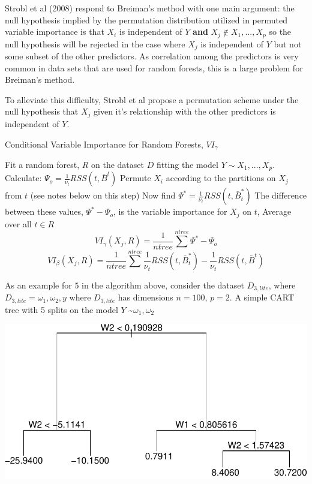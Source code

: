 \documentclass[12pt,twoside]{reedthesis}
\begin{document}
  Strobl et al (2008) respond to Breiman's method with one main argument:
  the null hypothesis implied by the permutation distribution utilized in
  permuted variable importance is that \(X_i\) is independent of \(Y\)
  \textbf{and} \({X_j \notin X_1,...,X_p}\) so the null hypothesis will be
  rejected in the case where \(X_j\) is independent of \(Y\) but not some
  subset of the other predictors. As correlation among the predictors is
  very common in data sets that are used for random forests, this is a
  large problem for Breiman's method.
  
  To alleviate this difficulty, Strobl et al propose a permutation scheme
  under the null hypothesis that \(X_j\) given it's relationship with the
  other predictors is independent of \(Y\).
  
  \begin{algorithm}
  \caption{Conditional Variable Importance for Random Forests, $VI_{\gamma}$}
  \label{strobl}
  \begin{algorithmic}[1]
  \State Fit a random forest, $R$ on the dataset $D$ fitting the model $Y \sim X_1,...,X_p$.
  \State Calculate: $\Psi_o =  \frac 1 {\nu_t} RSS(t,\bar{B}^t)$
  \State Permute $X_i$ according to the partitions on $X_j$ from $t$ (see notes below on this step)
  Now find $\Psi^* =  \frac 1 {\nu_t} RSS(t,\bar{B}_t^*)$
  \State The difference between these values, $\Psi^* - \Psi_o$,  is the variable importance for $X_j$ on $t$,  
  \EndFor
  \State Average over all $t \in R$ 
   $$VI_{\gamma}(X_j,R) = \frac 1 {ntree} \sum^{ntree} \Psi^* - \Psi_o$$
   $$VI_{\beta}(X_j, R) = \frac 1 {ntree} \sum^{ntree} \frac 1 {\nu_t} RSS(t,\bar{B}_t^*) - \frac 1 {\nu_t} RSS(t,\bar{B}^t)$$
  \EndFor
  \end{algorithmic}
  \end{algorithm}
  
  As an example for \(5\) in the algorithm above, consider the dataset
  \(D_{3,lite}\), where \(D_{3,lite} = {\omega_1, \omega_2, y}\) where
  \(D_{3,lite}\) has dimensions \(n = 100\), \(p = 2\). A simple CART tree
  with 5 splits on the model \(Y\) \textasciitilde{}\(\omega_1, \omega_2\)
  
  \begin{center}\includegraphics{Thesis_files/figure-latex/unnamed-chunk-2-1} \end{center}
  
\end{document}

